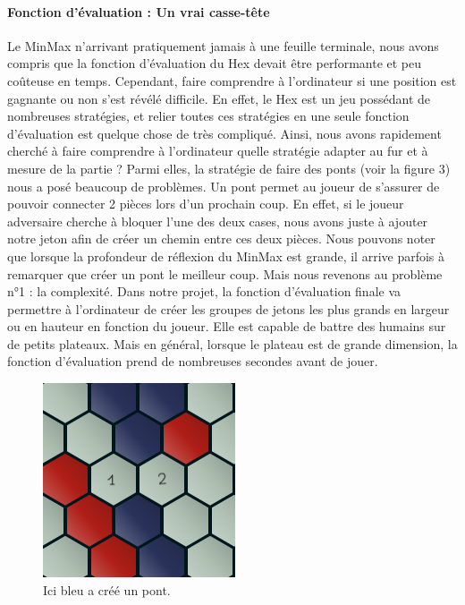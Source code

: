 \paragraph{Fonction d'évaluation : Un vrai casse-tête}Le MinMax n'arrivant pratiquement jamais à une feuille terminale, nous avons compris que la fonction
d'évaluation du Hex devait être performante et peu coûteuse en temps. Cependant, faire comprendre à l'ordinateur si une position est gagnante 
ou non s'est révélé difficile. En effet, le Hex est un jeu possédant de nombreuses stratégies, et relier toutes ces stratégies en une 
seule fonction d'évaluation est quelque chose de très compliqué. Ainsi, nous avons rapidement cherché à faire comprendre à l'ordinateur 
quelle stratégie adapter au fur et à mesure de la partie ? Parmi elles, la stratégie de faire des ponts (voir la figure 3) nous a posé beaucoup de problèmes.
Un pont permet au joueur de s'assurer de pouvoir connecter 2 pièces lors d'un prochain coup. En effet, si le joueur adversaire cherche à bloquer
l'une des deux cases, nous avons juste à ajouter notre jeton afin de créer un chemin entre ces deux pièces. Nous pouvons noter que lorsque la profondeur de 
réflexion du MinMax est grande, il arrive parfois à remarquer que créer un pont le meilleur coup. Mais nous revenons au problème n°1 : la complexité. 
Dans notre projet, la fonction d'évaluation finale va permettre à l'ordinateur de créer les groupes de jetons les plus grands en largeur ou en hauteur en 
fonction du joueur. Elle est capable de battre des humains sur de petits plateaux. Mais en général, lorsque le plateau est de grande dimension, la fonction
d'évaluation prend de nombreuses secondes avant de jouer.
\begin{figure}[h]
    \begin{center}
        \includegraphics[scale=0.5]{root/pont.png}
    \end{center}
    \caption[1]{Ici bleu a créé un pont\footnotemark.}\label{fig:pont_bleu}
\end{figure}


